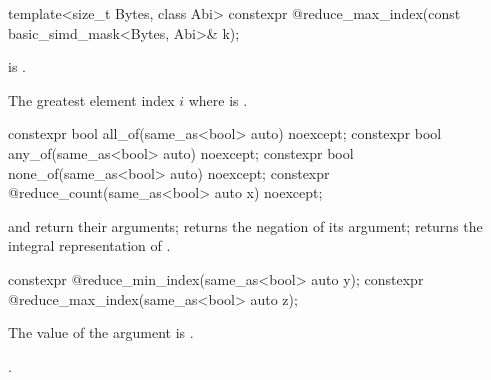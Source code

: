 \begin{itemdecl}
template<size_t Bytes, class Abi>
  constexpr @\simdsizetype@ reduce_max_index(const basic_simd_mask<Bytes, Abi>& k);
\end{itemdecl}

\begin{itemdescr}
  \pnum\expects
   is .

  \pnum\returns
  The greatest element index $i$ where  is .
\end{itemdescr}

\begin{itemdecl}
constexpr bool all_of(same_as<bool> auto) noexcept;
constexpr bool any_of(same_as<bool> auto) noexcept;
constexpr bool none_of(same_as<bool> auto) noexcept;
constexpr @\simdsizetype@ reduce_count(same_as<bool> auto x) noexcept;
\end{itemdecl}

\begin{itemdescr}
  \pnum\returns
   and  return their arguments; 
  returns the negation of its argument;  returns the
  integral representation of .
\end{itemdescr}

\begin{itemdecl}
constexpr @\simdsizetype@ reduce_min_index(same_as<bool> auto y);
constexpr @\simdsizetype@ reduce_max_index(same_as<bool> auto z);
\end{itemdecl}

\begin{itemdescr}
  \pnum\expects
  The value of the argument is .

  \pnum\returns {}.
\end{itemdescr}

